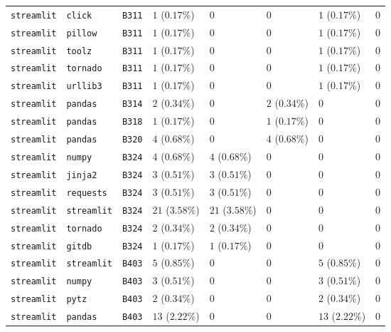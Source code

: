 \begin{table}
\begin{tabular}{llllllll}
\texttt{streamlit} & \texttt{click} & \texttt{B311} & $1$ ($0.17\%$) & $0$ & $0$ & $1$ ($0.17\%$) & $0$ \\
\texttt{streamlit} & \texttt{pillow} & \texttt{B311} & $1$ ($0.17\%$) & $0$ & $0$ & $1$ ($0.17\%$) & $0$ \\
\texttt{streamlit} & \texttt{toolz} & \texttt{B311} & $1$ ($0.17\%$) & $0$ & $0$ & $1$ ($0.17\%$) & $0$ \\
\texttt{streamlit} & \texttt{tornado} & \texttt{B311} & $1$ ($0.17\%$) & $0$ & $0$ & $1$ ($0.17\%$) & $0$ \\
\texttt{streamlit} & \texttt{urllib3} & \texttt{B311} & $1$ ($0.17\%$) & $0$ & $0$ & $1$ ($0.17\%$) & $0$ \\
\texttt{streamlit} & \texttt{pandas} & \texttt{B314} & $2$ ($0.34\%$) & $0$ & $2$ ($0.34\%$) & $0$ & $0$ \\
\texttt{streamlit} & \texttt{pandas} & \texttt{B318} & $1$ ($0.17\%$) & $0$ & $1$ ($0.17\%$) & $0$ & $0$ \\
\texttt{streamlit} & \texttt{pandas} & \texttt{B320} & $4$ ($0.68\%$) & $0$ & $4$ ($0.68\%$) & $0$ & $0$ \\
\texttt{streamlit} & \texttt{numpy} & \texttt{B324} & $4$ ($0.68\%$) & $4$ ($0.68\%$) & $0$ & $0$ & $0$ \\
\texttt{streamlit} & \texttt{jinja2} & \texttt{B324} & $3$ ($0.51\%$) & $3$ ($0.51\%$) & $0$ & $0$ & $0$ \\
\texttt{streamlit} & \texttt{requests} & \texttt{B324} & $3$ ($0.51\%$) & $3$ ($0.51\%$) & $0$ & $0$ & $0$ \\
\texttt{streamlit} & \texttt{streamlit} & \texttt{B324} & $21$ ($3.58\%$) & $21$ ($3.58\%$) & $0$ & $0$ & $0$ \\
\texttt{streamlit} & \texttt{tornado} & \texttt{B324} & $2$ ($0.34\%$) & $2$ ($0.34\%$) & $0$ & $0$ & $0$ \\
\texttt{streamlit} & \texttt{gitdb} & \texttt{B324} & $1$ ($0.17\%$) & $1$ ($0.17\%$) & $0$ & $0$ & $0$ \\
\texttt{streamlit} & \texttt{streamlit} & \texttt{B403} & $5$ ($0.85\%$) & $0$ & $0$ & $5$ ($0.85\%$) & $0$ \\
\texttt{streamlit} & \texttt{numpy} & \texttt{B403} & $3$ ($0.51\%$) & $0$ & $0$ & $3$ ($0.51\%$) & $0$ \\
\texttt{streamlit} & \texttt{pytz} & \texttt{B403} & $2$ ($0.34\%$) & $0$ & $0$ & $2$ ($0.34\%$) & $0$ \\
\texttt{streamlit} & \texttt{pandas} & \texttt{B403} & $13$ ($2.22\%$) & $0$ & $0$ & $13$ ($2.22\%$) & $0$ \\

\end{tabular}
\end{table}
